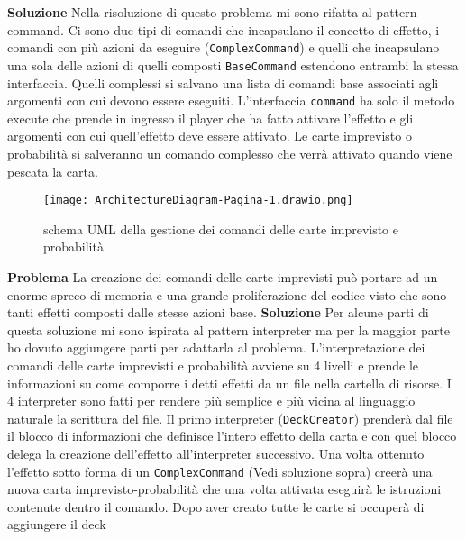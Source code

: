 \textbf{Soluzione}\newline
Nella risoluzione di questo problema mi sono rifatta al pattern command. Ci sono due tipi di comandi che incapsulano il concetto di effetto, i comandi con più azioni da eseguire (\texttt{ComplexCommand}) e quelli che incapsulano una sola delle azioni di quelli composti \texttt{BaseCommand} estendono entrambi la stessa interfaccia. Quelli complessi  si salvano una lista di comandi base associati agli argomenti con cui devono essere eseguiti. 
L’interfaccia \texttt{command} ha solo il metodo execute che prende in ingresso il player che ha fatto attivare l’effetto e gli argomenti con cui quell’effetto deve essere attivato. 
Le carte imprevisto o probabilità si salveranno un comando complesso che verrà attivato quando viene pescata la carta.
\begin{figure}[h]
    \centering
    \texttt{[image: ArchitectureDiagram-Pagina-1.drawio.png]}
    \caption{schema UML della gestione dei comandi delle carte imprevisto e probabilità}
    \label{img:ArchitectureDiagram-Pagina-1}
\end{figure}
\newline\newline
\textbf{Problema}\newline
La creazione dei comandi delle carte imprevisti può portare ad un enorme spreco di memoria e una grande proliferazione del codice visto che sono tanti effetti composti dalle stesse azioni base.  \newline\newline
\textbf{Soluzione}\newline
Per alcune parti di questa soluzione mi sono ispirata al pattern interpreter ma per la maggior parte ho dovuto aggiungere parti per adattarla al problema. 
L’interpretazione dei comandi delle carte imprevisti e probabilità avviene su 4 livelli e prende le informazioni su come comporre i detti effetti da un file nella cartella di risorse. 
I 4 interpreter sono fatti per rendere più semplice e più vicina al linguaggio naturale la scrittura del file. 
Il primo interpreter (\texttt{DeckCreator}) prenderà dal file il blocco di informazioni che definisce l’intero effetto della carta e con quel blocco delega la creazione dell’effetto all’interpreter successivo. Una volta ottenuto l’effetto sotto forma di un \texttt{ComplexCommand} (Vedi soluzione sopra) creerà una nuova carta imprevisto-probabilità che una volta attivata eseguirà le istruzioni contenute dentro il comando. Dopo aver creato tutte le carte si occuperà di aggiungere il deck
